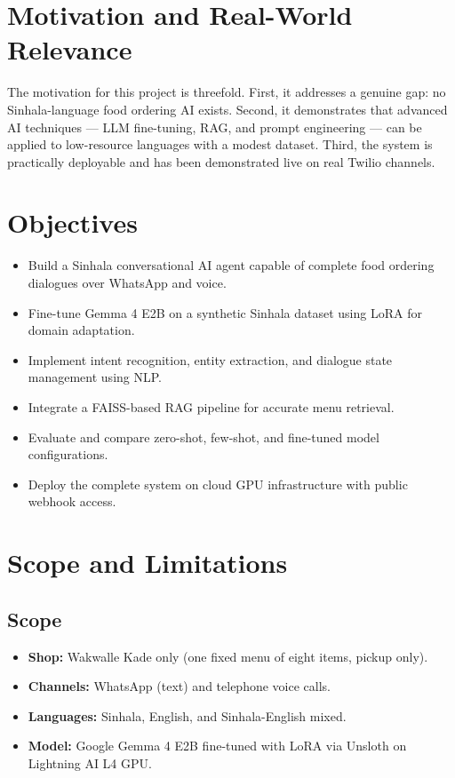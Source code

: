 \documentclass[12pt,a4paper]{report}
\begin{document}
\section{Motivation and Real-World Relevance}
The motivation for this project is threefold. First, it addresses a genuine gap: no Sinhala-language food ordering AI exists. Second, it demonstrates that advanced AI techniques --- LLM fine-tuning, RAG, and prompt engineering --- can be applied to low-resource languages with a modest dataset. Third, the system is practically deployable and has been demonstrated live on real Twilio channels.

\section{Objectives}
\begin{itemize}
    \item Build a Sinhala conversational AI agent capable of complete food ordering dialogues over WhatsApp and voice.
    \item Fine-tune Gemma 4 E2B on a synthetic Sinhala dataset using LoRA for domain adaptation.
    \item Implement intent recognition, entity extraction, and dialogue state management using NLP.
    \item Integrate a FAISS-based RAG pipeline for accurate menu retrieval.
    \item Evaluate and compare zero-shot, few-shot, and fine-tuned model configurations.
    \item Deploy the complete system on cloud GPU infrastructure with public webhook access.
\end{itemize}

\section{Scope and Limitations}

\subsection{Scope}
\begin{itemize}
    \item \textbf{Shop:} Wakwalle Kade only (one fixed menu of eight items, pickup only).
    \item \textbf{Channels:} WhatsApp (text) and telephone voice calls.
    \item \textbf{Languages:} Sinhala, English, and Sinhala-English mixed.
    \item \textbf{Model:} Google Gemma 4 E2B fine-tuned with LoRA via Unsloth on Lightning AI L4 GPU.
\end{itemize}
\end{document}

